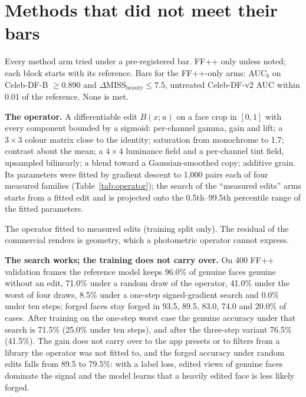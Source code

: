 \documentclass[10pt]{article}
\begin{document}
\section{Methods that did not meet their bars}
\begin{table}[H]
\centering
\caption{Every method arm tried under a pre-registered bar. FF++ only unless noted; each block starts with its
reference. Bars for the FF++-only arms: AUC$_b$ on Celeb-DF-B $\ge 0.890$ and $\Delta$MISS$_\text{beauty}\le 7.5$,
untreated Celeb-DF-v2 AUC within 0.01 of the reference. None is met.}
\label{tab:negative}
\footnotesize
\begin{adjustbox}{max width=\linewidth}\end{adjustbox}
\end{table}
\textbf{The operator.} A differentiable edit $B(x;u)$ on a face crop in $[0,1]$ with every component bounded by a
sigmoid: per-channel gamma, gain and lift; a $3\times3$ colour matrix close to the identity; saturation from monochrome
to 1.7; contrast about the mean; a $4\times4$ luminance field and a per-channel tint field, upsampled bilinearly; a blend
toward a Gaussian-smoothed copy; additive grain. Its parameters were fitted by gradient descent to 1,000 pairs each of
four measured families (Table~\ref{tab:operator}); the search of the ``measured edits'' arms starts from a fitted edit and
is projected onto the 0.5th--99.5th percentile range of the fitted parameters.
\begin{table}[H]
\centering
\caption{The operator fitted to measured edits (training split only). The residual of the commercial renders is
geometry, which a photometric operator cannot express.}
\label{tab:operator}
\footnotesize

\end{table}

\textbf{The search works; the training does not carry over.} On 400 FF++ validation frames the reference model keeps
96.0\% of genuine faces genuine without an edit, 71.0\% under a random draw of the operator, 41.0\% under the worst of
four draws, 8.5\% under a one-step signed-gradient search and 0.0\% under ten steps; forged faces stay forged in 93.5,
89.5, 83.0, 74.0 and 20.0\% of cases. After training on the one-step worst case the genuine accuracy under that search
is 71.5\% (25.0\% under ten steps), and after the three-step variant 76.5\% (41.5\%). The gain does not carry over to the
app presets or to filters from a library the operator was not fitted to, and the forged accuracy under random edits falls
from 89.5 to 79.5\%: with a label loss, edited views of genuine faces dominate the signal and the model learns that a
heavily edited face is less likely forged.
\end{document}

